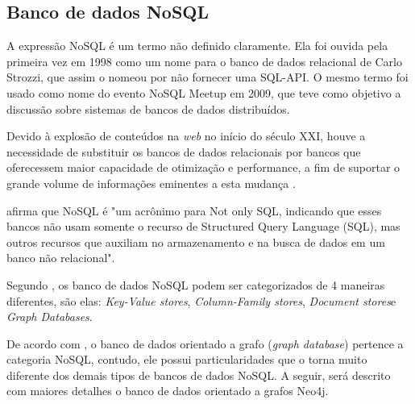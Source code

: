 \subsection{Banco de dados NoSQL}

\par A expressão NoSQL é um termo não definido claramente. Ela foi ouvida pela primeira vez em 1998 como um nome para o banco de dados relacional de Carlo Strozzi, que assim o nomeou por não fornecer uma SQL-API. O mesmo termo foi usado como nome do evento NoSQL Meetup em 2009, que teve como objetivo a discussão sobre sistemas de bancos de dados distribuídos.

\par Devido à explosão de conteúdos na \textit{web} no início do século XXI, houve a necessidade de substituir os bancos de dados relacionais por bancos que oferecessem maior capacidade de otimização e performance, a fim de suportar o grande volume de informações eminentes a esta mudança \cite{bruggen_learning_neo4j}.

\par {} afirma que NoSQL é "um acrônimo para Not only SQL, indicando que esses bancos não usam somente o recurso de Structured Query Language (SQL), mas outros recursos que auxiliam no armazenamento e na busca de dados em um banco  não relacional".

\par Segundo , os banco de dados NoSQL podem ser categorizados de 4 maneiras diferentes, são elas: \textit{Key-Value stores}\footnotemark[7], \textit{Column-Family stores}\footnotemark[8], \textit{Document stores}\footnotemark[9] e \textit{Graph Databases}\footnotemark[10].





\par De acordo com , o banco de dados orientado a grafo (\textit{graph database}) pertence a categoria NoSQL, contudo, ele possui particularidades que o torna muito diferente dos demais tipos de bancos de dados NoSQL. A seguir, será descrito com maiores detalhes o banco de dados orientado a grafos Neo4j.
